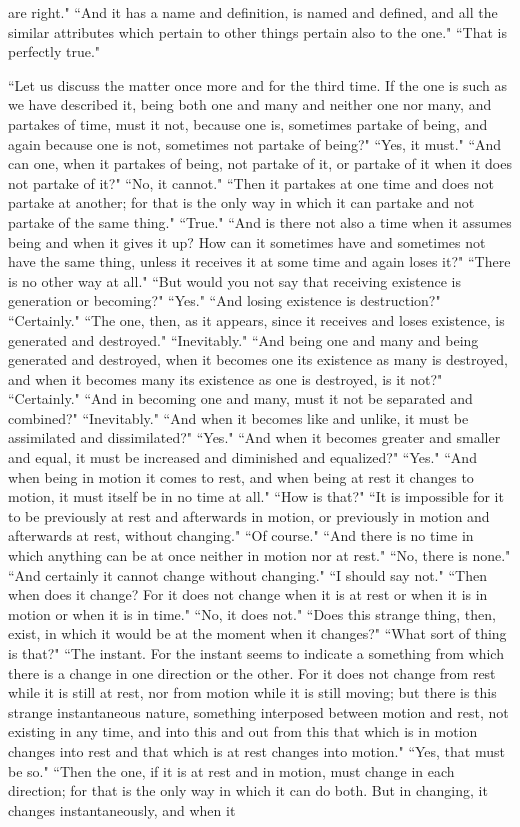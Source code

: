 \documentclass[letterpaper,12pt]{article}
\newcommand{\stephpag}[1]{\marginnote{\small\itshape\fontfamily{ppl}\selectfont #1}}
\begin{document}
are right." ``And it has a name and definition, is named and defined, \stephpag{e} and all the similar attributes which pertain to other things pertain also to the one." ``That is perfectly true."

``Let us discuss the matter once more and for the third time. If the one is such as we have described it, being both one and many and neither one nor many, and partakes of time, must it not, because one is, sometimes partake of being, and again because one is not, sometimes not partake of being?" ``Yes, it must." ``And can one, when it partakes of being, not partake of it, or partake of it when it does not partake of it?" ``No, it cannot." ``Then it partakes at one time and does not partake at another; for that is the only way in which it can partake and not partake of the same thing." \stephpag{156 a} ``True." ``And is there not also a time when it assumes being and when it gives it up? How can it sometimes have and sometimes not have the same thing, unless it receives it at some time and again loses it?" ``There is no other way at all." ``But would you not say that receiving existence is generation or becoming?" ``Yes." ``And losing existence is destruction?" ``Certainly." ``The one, then, as it appears, since it receives and loses existence, is generated and destroyed." \stephpag{b} ``Inevitably." ``And being one and many and being generated and destroyed, when it becomes one its existence as many is destroyed, and when it becomes many its existence as one is destroyed, is it not?" ``Certainly." ``And in becoming one and many, must it not be separated and combined?" ``Inevitably." ``And when it becomes like and unlike, it must be assimilated and dissimilated?" ``Yes." ``And when it becomes greater and smaller and equal, it must be increased and diminished and equalized?" \stephpag{c} ``Yes." ``And when being in motion it comes to rest, and when being at rest it changes to motion, it must itself be in no time at all." ``How is that?" ``It is impossible for it to be previously at rest and afterwards in motion, or previously in motion and afterwards at rest, without changing." ``Of course." ``And there is no time in which anything can be at once neither in motion nor at rest." ``No, there is none." ``And certainly it cannot change without changing." ``I should say not." ``Then when does it change? For it does not change when it is at rest or when it is in motion or when it is in time." \stephpag{d} ``No, it does not." ``Does this strange thing, then, exist, in which it would be at the moment when it changes?" ``What sort of thing is that?" ``The instant. For the instant seems to indicate a something from which there is a change in one direction or the other. For it does not change from rest while it is still at rest, nor from motion while it is still moving; but there is this strange instantaneous nature, something interposed between \stephpag{e} motion and rest, not existing in any time, and into this and out from this that which is in motion changes into rest and that which is at rest changes into motion." ``Yes, that must be so." ``Then the one, if it is at rest and in motion, must change in each direction; for that is the only way in which it can do both. But in changing, it changes instantaneously, and when it 
\end{document}
